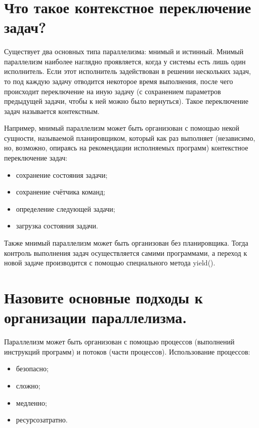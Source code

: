 \documentclass[a4paper,12pt]{article}	%
\title{
	\center{\textbf{Seminar 18.}}
	}
\begin{document}

\maketitle

\section{Что такое контекстное переключение задач?}

	Существует два основных типа параллелизма: мнимый и истинный. Мнимый параллелизм наиболее наглядно проявляется, когда у системы есть лишь один исполнитель. Если этот исполнитель задействован в решении нескольких задач, то под каждую задачу отводится некоторое время выполнения, после чего происходит переключение на иную задачу (с сохранением параметров предыдущей задачи, чтобы к ней можно было вернуться). Такое переключение задач называется контекстным.
	
	Например, мнимый параллелизм может быть организован с помощью некой сущности, называемой планировщиком, который как раз выполняет (независимо, но, возможно, опираясь на рекомендации исполняемых программ) контекстное переключение задач:
	
	\begin{itemize}
	
		\item сохранение состояния задачи;
		\item сохранение счётчика команд;
		\item определение следующей задачи;
		\item загрузка состояния задачи.

	\end{itemize}
	
	Также мнимый параллелизм может быть организован без планировщика. Тогда контроль выполнения задач осуществляется самими программами, а переход к новой задаче производится с помощью специального метода yield().
	
\section{Назовите основные подходы к организации параллелизма.}

	Параллелизм может быть организован с помощью процессов (выполнений инструкций программ) и потоков (части процессов). Использование процессов:
	
	\begin{itemize}
		
		\item безопасно;
		\item сложно;
		\item медленно;
		\item ресурсозатратно.
	
	\end{itemize}
	
\end{document}
